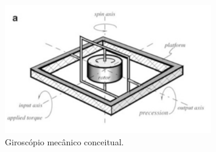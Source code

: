 


\begin{figure}[ht]
    \centering
    \caption{Giroscópio mecânico conceitual.}
    \begin{center}
        \includegraphics[width=0.8\textwidth]{img/print_giroscopio_mecanico_conceitual.png}
    \end{center}
    \vspace{-0.5cm}
    

    
    \label{fig:Giroscopio_Conceitual}
\end{figure}